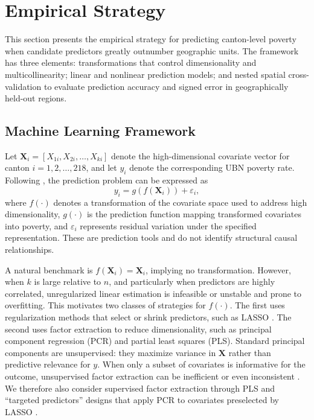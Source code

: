 \documentclass[pdflatex,sn-apa]{sn-jnl}
\begin{document}
\section{Empirical Strategy}
\label{sec:methods}

This section presents the empirical strategy for predicting canton-level poverty when candidate predictors greatly outnumber geographic units. The framework has three elements: transformations that control dimensionality and multicollinearity; linear and nonlinear prediction models; and nested spatial cross-validation to evaluate prediction accuracy and signed error in geographically held-out regions.

\subsection{Machine Learning Framework}

Let $\mathbf{X}_i=[X_{1i},X_{2i},\dots,X_{ki}]$ denote the high-dimensional covariate vector for canton $i=1,2,\dots,218$, and let $y_i$ denote the corresponding UBN poverty rate. Following \citet{GouletCoulombe2021, GouletCoulombe2022}, the prediction problem can be expressed as
\begin{equation}
y_i = g(f(\mathbf{X}_i)) + \varepsilon_i,
\label{eq:poverty_problem}
\end{equation}
where $f(\cdot)$ denotes a transformation of the covariate space used to address high dimensionality, $g(\cdot)$ is the prediction function mapping transformed covariates into poverty, and $\varepsilon_i$ represents residual variation under the specified representation. These are prediction tools and do not identify structural causal relationships.

A natural benchmark is $f(\mathbf{X}_i)=\mathbf{X}_i$, implying no transformation. However, when $k$ is large relative to $n$, and particularly when predictors are highly correlated, unregularized linear estimation is infeasible or unstable and prone to overfitting. This motivates two classes of strategies for $f(\cdot)$. The first uses regularization methods that select or shrink predictors, such as LASSO \citep{Tibshirani1996}. The second uses factor extraction to reduce dimensionality, such as principal component regression (PCR) and partial least squares (PLS). Standard principal components are unsupervised: they maximize variance in $\mathbf{X}$ rather than predictive relevance for $y$. When only a subset of covariates is informative for the outcome, unsupervised factor extraction can be inefficient or even inconsistent \citep{Bair2006}. We therefore also consider supervised factor extraction through PLS \citep{WOLD1973, Hastie2009} and ``targeted predictors'' designs that apply PCR to covariates preselected by LASSO \citep{bai2008forecasting}.
\end{document}
